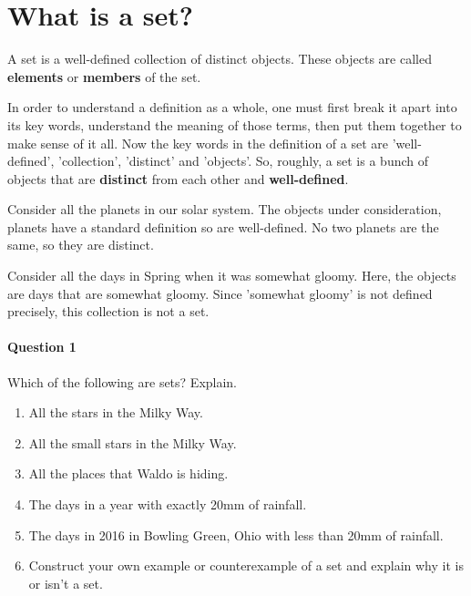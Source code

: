 \section{What is a set?}
\begin{definition}
A set is a well-defined collection of distinct objects. These objects are called \textbf{elements} or \textbf{members} of the set.

\end{definition}

\begin{remark}

In order to understand a definition as a whole, one must first break it apart into its key words, understand the meaning of those terms, then put them together to make sense of it all. Now the key words in the definition of a set are 'well-defined', 'collection', 'distinct' and 'objects'. So, roughly, a set is a bunch of objects that are \textbf{distinct} from each other and \textbf{well-defined}.
\end{remark}

\begin{example}
Consider all the planets in our solar system. The objects under consideration, planets have a standard definition %
so are well-defined. No two planets are the same, so they are distinct. 

\end{example}

\begin{example}
Consider all the days in Spring when it was somewhat gloomy. Here, the objects are days that are somewhat gloomy. Since 'somewhat gloomy' is not defined precisely, this collection is not a set.

\end{example}

\paragraph{Question 1} Which of the following are sets? Explain.
\begin{enumerate}
\item All the stars in the Milky Way.
\vspace{3em}
\item All the small stars in the Milky Way.
\vspace{3em}
\item All the places that Waldo is hiding.
\vspace{3em}
\item The days in a year with exactly 20mm of rainfall.
\vspace{3em}
\item The days in 2016 in Bowling Green, Ohio with less than 20mm of rainfall.
\vspace{3em}
\item Construct your own example or counterexample of a set and explain why it is or isn't a set.
\vspace{3em}
\end{enumerate}

